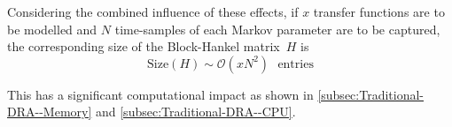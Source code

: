 Considering the combined  influence of these effects, if  $x$ transfer functions
are to  be modelled  and $N$  time-samples of  each Markov  parameter are  to be
captured, the corresponding size of the Block-Hankel matrix~$H$ is
\begin{equation}
    \text{Size}(H)\sim \mathcal{O}(xN^2)\text{ {entries}}
\end{equation}

This    has    a    significant     computational    impact    as    shown    in
\cref{subsec:Traditional-DRA--Memory} and \cref{subsec:Traditional-DRA--CPU}.





